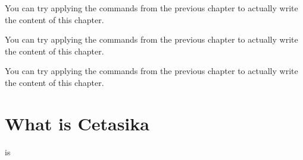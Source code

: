 You can try applying the commands from the previous chapter to actually write the content of this chapter.

You can try applying the commands from the previous chapter to actually write the content of this chapter.

You can try applying the commands from the previous chapter to actually write the content of this chapter.

\section{What is Cetasika}
 is 

\commentarytable%